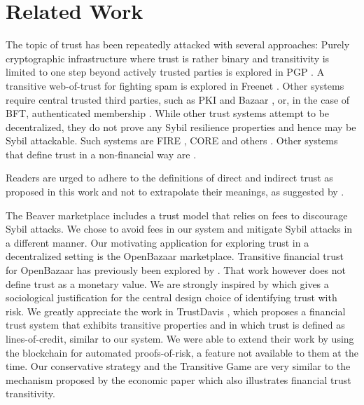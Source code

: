 \section{Related Work}
  The topic of trust has been repeatedly attacked with several approaches: Purely cryptographic infrastructure where trust
  is rather binary and transitivity is limited to one step beyond actively trusted parties is explored in PGP \cite{pgp}. A
  transitive web-of-trust for fighting spam is explored in Freenet \cite{freenet}. Other systems require central trusted
  third parties, such as PKI \cite{pki} and Bazaar \cite{bazaar}, or, in the case of BFT, authenticated membership
  \cite{byzantine}. While other trust systems attempt to be decentralized, they do not prove any Sybil resilience properties
  and hence may be Sybil attackable. Such systems are FIRE \cite{fire}, CORE \cite{core} and others \cite{openrep,ghkkw,rk}.
  Other systems that define trust in a non-financial way are \cite{mui,beta,pace,vpc,sdt,wot,pathfinder}.

  Readers are urged to adhere to the definitions of direct and indirect trust as proposed in this work and not to extrapolate
  their meanings, as suggested by \cite{badtrust}.

  The Beaver marketplace \cite{beaver} includes a trust model that relies on
  fees to discourage Sybil attacks. We chose to avoid fees in our system and mitigate Sybil attacks in a different manner.
  Our motivating application for exploring trust in a decentralized setting is the OpenBazaar marketplace. Transitive
  financial trust for OpenBazaar has previously been explored by \cite{dionyziz}. That work however does not define trust
  as a monetary value. We are strongly inspired by \cite{kmrs}
  which gives a sociological justification for the central design choice of identifying trust with
  risk. We greatly appreciate the work in TrustDavis \cite{davis}, which proposes a financial trust system that exhibits
  transitive properties and in which trust is defined as lines-of-credit, similar to our system. We were able to extend
  their work by using the blockchain for automated proofs-of-risk, a feature not available to them at the time. Our
  conservative strategy and the Transitive Game are very similar to the mechanism proposed by the economic paper
  \cite{iou} which also illustrates financial trust transitivity. 

